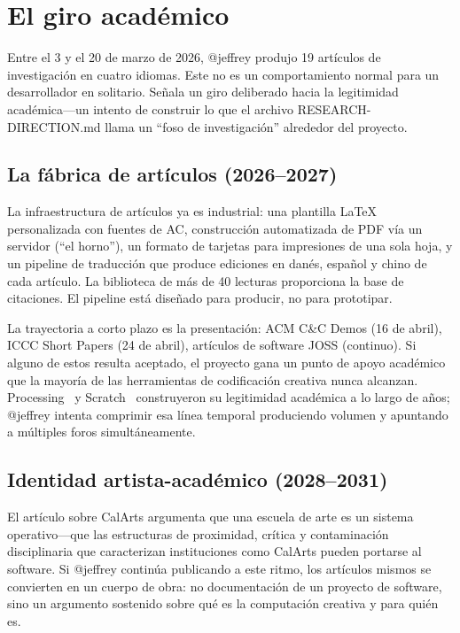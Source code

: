 \documentclass[10pt,letterpaper,twocolumn]{article}
\begin{document}

\section{El giro académico}
\label{sec:scholarly}

Entre el 3 y el 20 de marzo de 2026, @jeffrey produjo 19 artículos de investigación en cuatro idiomas. Este no es un comportamiento normal para un desarrollador en solitario. Señala un giro deliberado hacia la legitimidad académica---un intento de construir lo que el archivo RESEARCH-DIRECTION.md llama un ``foso de investigación'' alrededor del proyecto.

\subsection{La fábrica de artículos (2026--2027)}

La infraestructura de artículos ya es industrial: una plantilla \LaTeX{} personalizada con fuentes de AC, construcción automatizada de PDF vía un servidor (``el horno''), un formato de tarjetas para impresiones de una sola hoja, y un pipeline de traducción que produce ediciones en danés, español y chino de cada artículo. La biblioteca de más de 40 lecturas proporciona la base de citaciones. El pipeline está diseñado para producir, no para prototipar.

La trayectoria a corto plazo es la presentación: ACM C\&C Demos (16 de abril), ICCC Short Papers (24 de abril), artículos de software JOSS (continuo). Si alguno de estos resulta aceptado, el proyecto gana un punto de apoyo académico que la mayoría de las herramientas de codificación creativa nunca alcanzan. Processing~\citep{reas2007processing} y Scratch~\citep{resnick2009scratch} construyeron su legitimidad académica a lo largo de años; @jeffrey intenta comprimir esa línea temporal produciendo volumen y apuntando a múltiples foros simultáneamente.

\subsection{Identidad artista-académico (2028--2031)}

El artículo sobre CalArts argumenta que una escuela de arte es un sistema operativo---que las estructuras de proximidad, crítica y contaminación disciplinaria que caracterizan instituciones como CalArts pueden portarse al software. Si @jeffrey continúa publicando a este ritmo, los artículos mismos se convierten en un cuerpo de obra: no documentación de un proyecto de software, sino un argumento sostenido sobre qué es la computación creativa y para quién es.
\end{document}
